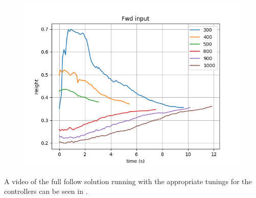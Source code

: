 \begin{figure}
  \centering
  \includegraphics[width=.8\textwidth, keepaspectratio]{img/pid/validation_fwd.png}
  \caption{}\label{fig:validate-fwd}
\end{figure}

A video of the full follow solution running with the appropriate tunings for the controllers can be seen in .


\clearpage




\clearpage